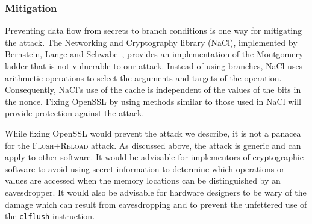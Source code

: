 \documentclass[twocolumn]{svjour3}
\begin{document}
\subsubsection*{Mitigation}


Preventing data flow from secrets to branch conditions is one way for mitigating the attack.
The Networking and Cryptography library (NaCl), implemented by Bernstein, Lange and Schwabe~\cite{dan-tan-peter}, 
provides an implementation of the Montgomery ladder that is not vulnerable to our attack.
Instead of using branches, NaCl uses arithmetic operations to select the arguments and targets of the operation.
Consequently, NaCl's use of the cache is independent of the values of the bits in the nonce.
Fixing OpenSSL by using methods similar to those used in NaCl will provide protection against the attack.

While fixing OpenSSL would prevent the attack we describe, it is not a panacea for the \textsc{Flush+Reload} attack.
As discussed above, the attack is generic and can apply to other software.
It would be advisable for implementors of cryptographic software to avoid using secret information to determine which operations or values are accessed when the memory locations can be distinguished by an eavesdropper. It would also be advisable for hardware designers to be wary of the damage which can result from eavesdropping and to prevent the unfettered use of the \texttt{clflush} instruction.


\end{document}
